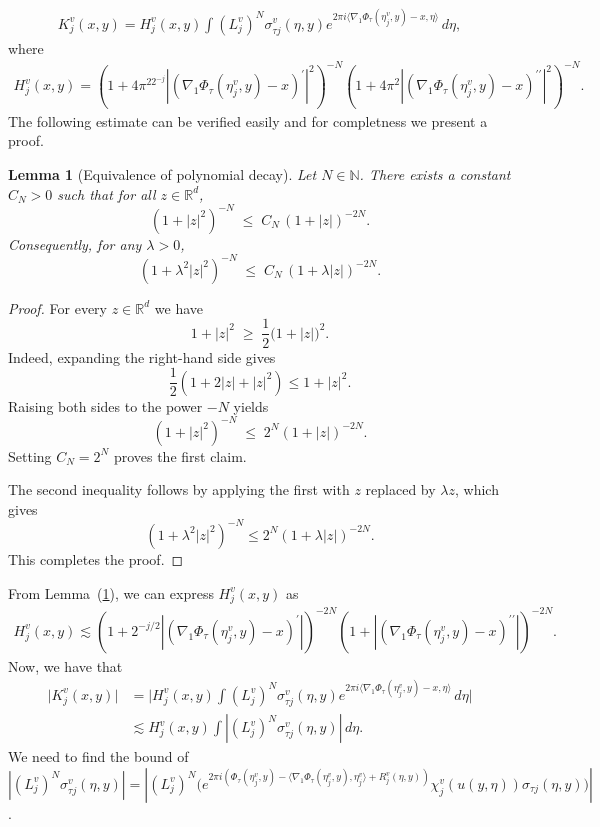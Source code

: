 \documentclass[12pt, reqno]{amsart}
\newtheorem{lemma}[theorem]{Lemma}
\theoremstyle{definition}
\theoremstyle{remark}
\numberwithin{equation}{section}
\begin{document}
\begin{align}
        K_j^v(x,y)=H_j^v(x,y)\int (L_j^v)^N\sigma_{\tau j}^v(\eta,y) e^{2\pi i \langle \nabla_1\Phi_{\tau}(\eta_j^v,y)-x,\eta\rangle}\,d\eta, 
    \end{align}
where 
\begin{align}
    H_j^v(x,y)= (1+4\pi^22^{-j}|( \nabla_1\Phi_{\tau}(\eta_j^v,y)-x)^{\prime}|^2)^{-N}(1+4\pi^2|( \nabla_1\Phi_{\tau}(\eta_j^v,y)-x)^{\prime\prime}|^2)^{-N}.\label{H}
\end{align}
The following estimate can be verified easily and for completness we present a proof.
\begin{lemma}[Equivalence of polynomial decay]\label{EOPD}
Let $N\in\mathbb{N}$. There exists a constant $C_N>0$ such that for all
$z\in\mathbb{R}^d$,
\[
(1+|z|^2)^{-N} \;\le\; C_N\,(1+|z|)^{-2N}.
\]
Consequently, for any $\lambda>0$,
\[
(1+\lambda^2|z|^2)^{-N}
\;\le\;
C_N\,(1+\lambda|z|)^{-2N}.
\]
\end{lemma}

\begin{proof}
For every $z\in\mathbb{R}^d$ we have
\[
1+|z|^2
\;\ge\;
\frac12\bigl(1+|z|\bigr)^2.
\]
Indeed, expanding the right-hand side gives
\[
\frac12(1+2|z|+|z|^2)\le 1+|z|^2.
\]
Raising both sides to the power $-N$ yields
\[
(1+|z|^2)^{-N}
\;\le\;
2^N(1+|z|)^{-2N}.
\]
Setting $C_N=2^N$ proves the first claim.

The second inequality follows by applying the first with $z$ replaced by
$\lambda z$, which gives
\[
(1+\lambda^2|z|^2)^{-N}
\le
2^N(1+\lambda|z|)^{-2N}.
\]
This completes the proof.
\end{proof}
From Lemma~(\ref{EOPD}), we can express $H^v_j(x,y)$ as 
\begin{align*}
    H_j^v(x,y)\lesssim (1+2^{-j/2}|( \nabla_1\Phi_{\tau}(\eta_j^v,y)-x)^{\prime}|)^{-2N}(1+|( \nabla_1\Phi_{\tau}(\eta_j^v,y)-x)^{\prime\prime}|)^{-2N}.
\end{align*} 
Now, we have that
\begin{align*}
        \big|K_j^v(x,y)\big|&= \big|H_j^v(x,y)\int (L_j^v)^N\sigma_{\tau j}^v(\eta,y) e^{2\pi i \langle \nabla_1\Phi_{\tau}(\eta_j^v,y)-x,\eta\rangle}\,d\eta \big|\\& \lesssim H_j^v(x,y)\int |(L_j^v)^N\sigma_{\tau j}^v(\eta,y)|\,d\eta.%
    \end{align*}
We need to find the bound of \\
$|(L_j^v)^N\sigma_{\tau j}^v(\eta,y)|=|(L_j^v)^N \big(e^{2\pi i(\Phi_{\tau}(\eta_j^v,y)-\langle \nabla_1\Phi_{\tau}(\eta_j^v,y),\eta_j^v\rangle+R_j^v(\eta,y))}\chi_j^v(u(y,\eta))\sigma_{ \tau j}(\eta,y)\big)|$.
\end{document}
